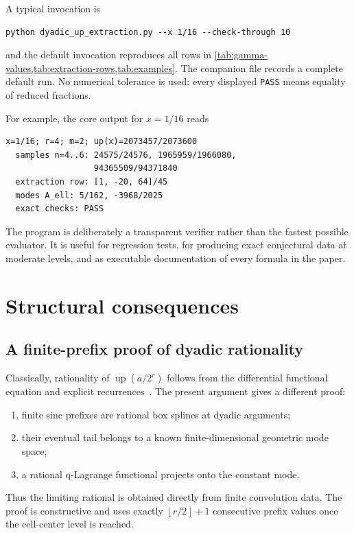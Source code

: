 \documentclass[11pt,a4paper]{article}
\theoremstyle{remark}
\newcommand{\up}{\operatorname{up}}
\newcommand{\floor}[1]{\left\lfloor #1\right\rfloor}
\begin{document}
A typical invocation is
\begin{lstlisting}
python dyadic_up_extraction.py --x 1/16 --check-through 10
\end{lstlisting}
and the default invocation reproduces all rows in
\cref{tab:gamma-values,tab:extraction-rows,tab:examples}.  The companion file
 records a complete default run.  No numerical
tolerance is used: every displayed \texttt{PASS} means equality of reduced
fractions.

For example, the core output for $x=1/16$ reads
\begin{lstlisting}
x=1/16; r=4; m=2; up(x)=2073457/2073600
  samples n=4..6: 24575/24576, 1965959/1966080,
                  94365509/94371840
  extraction row: [1, -20, 64]/45
  modes A_ell: 5/162, -3968/2025
  exact checks: PASS
\end{lstlisting}

The program is deliberately a transparent verifier rather than the fastest
possible evaluator.  It is useful for regression tests, for producing exact
conjectural data at moderate levels, and as executable documentation of every
formula in the paper.

\section{Structural consequences}
\label{sec:consequences}

\subsection{A finite-prefix proof of dyadic rationality}

Classically, rationality of $\up(a/2^r)$ follows from the differential
functional equation and explicit recurrences~\cite{Arias1982,Arias2018}.
The present argument gives a different proof:

\begin{enumerate}
\item finite sinc prefixes are rational box splines at dyadic arguments;
\item their eventual tail belongs to a known finite-dimensional geometric
mode space;
\item a rational q-Lagrange functional projects onto the constant mode.
\end{enumerate}

Thus the limiting rational is obtained directly from finite convolution data.
The proof is constructive and uses exactly $\floor{r/2}+1$ consecutive prefix
values once the cell-center level is reached.
\end{document}
